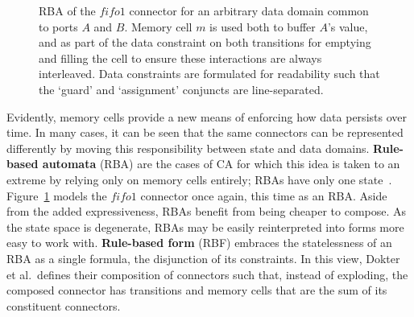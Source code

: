 \begin{figure}[ht]
	\centering
	\caption[RBA for fifo1 connector.]{RBA of the $fifo1$ connector for an arbitrary data domain common to ports $A$ and $B$. Memory cell $m$ is used both to buffer $A$'s value, and as part of the data constraint on both transitions for emptying and filling the cell to ensure these interactions are always interleaved. Data constraints are formulated for readability such that the `guard' and `assignment' conjuncts are line-separated.}
	\label{fig:fifo1_rba}
\end{figure}
Evidently, memory cells provide a new means of enforcing how data persists over time. In many cases, it can be seen that the same connectors can be represented differently by moving this responsibility between state and data domains. \textbf{Rule-based automata} (RBA) are the cases of CA for which this idea is taken to an extreme by relying only on memory cells entirely; RBAs have only one state~\cite{dokter2018rule}. Figure~\ref{fig:fifo1_rba} models the $fifo1$ connector once again, this time as an RBA. Aside from the added expressiveness, RBAs benefit from being cheaper to compose. As the state space is degenerate, RBAs may be easily reinterpreted into forms more easy to work with. \textbf{Rule-based form} (RBF) embraces the statelessness of an RBA as a single formula, the disjunction of its constraints. In this view, Dokter et al.\ defines their composition of connectors such that, instead of exploding, the composed connector has transitions and memory cells that are the sum of its constituent connectors.



